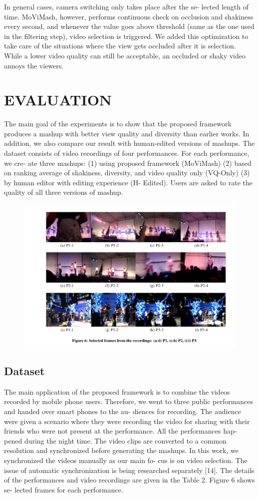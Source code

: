 \documentclass{sig-alternate}
\begin{document}
In general cases, camera switching only takes place after the se-
lected length of time. MoViMash, however, performs continuous
check on occlusion and shakiness every second, and whenever the
value goes above threshold (same as the one used in the filtering
step), video selection is triggered. We added this optimization to
take care of the situations where the view gets occluded after it is
selection. While a lower video quality can still be acceptable, an
occluded or shaky video annoys the viewers.

\section{EVALUATION}
The main goal of the experiments is to show that the proposed
framework produces a mashup with better view quality and diversity than earlier works. In addition, we also compare our result with human-edited versions of mashups. The dataset consists of video
recordings of four performances. For each performance, we cre-
ate three mashups: (1) using proposed framework (MoViMash) (2)
based on ranking average of shakiness, diversity, and video quality
only (VQ-Only) (3) by human editor with editing experience (H-
Edited). Users are asked to rate the quality of all three versions of
mashup.

\begin{figure}{
\centering
\includegraphics{image6.pdf}}
\end{figure}

\subsection{Dataset}
The main application of the proposed framework is to combine
the videos recorded by mobile phone users. Therefore, we went to
three public performances and handed over smart phones to the au-
diences for recording. The audience were given a scenario where
they were recording the video for sharing with their friends who
were not present at the performance. All the performances hap-
pened during the night time. The video clips are converted to a
common resolution and synchronized before generating the mashups.
In this work, we synchronized the videos manually as our main fo-
cus is on video selection. The issue of automatic synchronization is
being researched separately [14]. The details of the performances
and video recordings are given in the Table 2. Figure 6 shows se-
lected frames for each performance.
\end{document}
